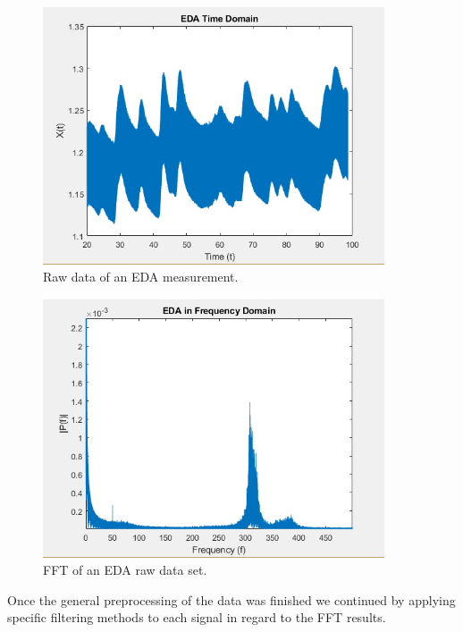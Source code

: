 \begin{figure}[ht]
\centering
\includegraphics[width=0.9\textwidth]{images/rawEDA.png}
\caption{Raw data of an EDA measurement.}
\label{rawEDAImg}
\end{figure}

\begin{figure}[ht]
\centering
\includegraphics[width=0.9\textwidth]{images/fftEDA.png}
\caption{FFT of an EDA raw data set.}
\label{fftEDAImg}
\end{figure}

Once the general preprocessing of the data was finished we continued by applying specific filtering methods to each signal in regard to the FFT results.

